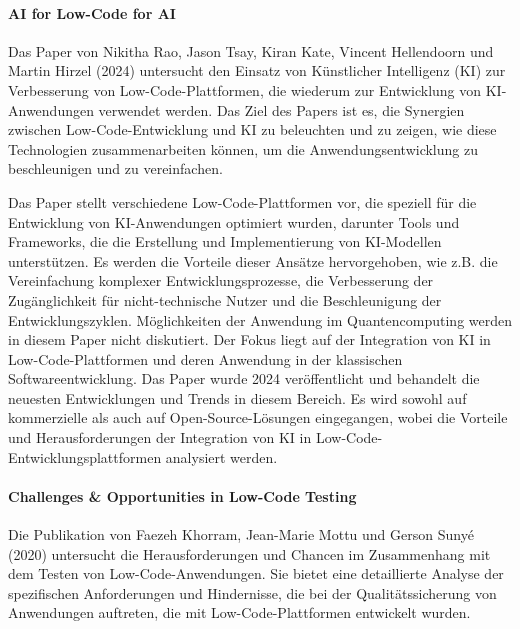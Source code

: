\paragraph{AI for Low-Code for AI}

Das Paper von Nikitha Rao, Jason Tsay, Kiran Kate, Vincent Hellendoorn und Martin Hirzel (2024) untersucht den Einsatz 
von Künstlicher Intelligenz (KI) zur Verbesserung von Low-Code-Plattformen, die wiederum zur Entwicklung von KI-Anwendungen 
verwendet werden. Das Ziel des Papers ist es, die Synergien zwischen Low-Code-Entwicklung und KI zu beleuchten und zu 
zeigen, wie diese Technologien zusammenarbeiten können, um die Anwendungsentwicklung zu beschleunigen und zu vereinfachen.

Das Paper stellt verschiedene Low-Code-Plattformen vor, die speziell für die Entwicklung von KI-Anwendungen optimiert wurden, 
darunter Tools und Frameworks, die die Erstellung und Implementierung von KI-Modellen unterstützen. 
Es werden die Vorteile dieser Ansätze hervorgehoben, wie z.B. die Vereinfachung komplexer Entwicklungsprozesse, 
die Verbesserung der Zugänglichkeit für nicht-technische Nutzer und die Beschleunigung der Entwicklungszyklen. 
Möglichkeiten der Anwendung im Quantencomputing werden in diesem Paper nicht diskutiert. 
Der Fokus liegt auf der Integration von KI in Low-Code-Plattformen und deren Anwendung in der klassischen Softwareentwicklung. 
Das Paper wurde 2024 veröffentlicht und behandelt die neuesten Entwicklungen und Trends in diesem Bereich. 
Es wird sowohl auf kommerzielle als auch auf Open-Source-Lösungen eingegangen, wobei die 
Vorteile und Herausforderungen der Integration von KI in Low-Code-Entwicklungsplattformen analysiert werden.

\paragraph{Challenges \& Opportunities in Low-Code Testing}

Die Publikation von Faezeh Khorram, Jean-Marie Mottu und Gerson Sunyé (2020) untersucht die Herausforderungen und Chancen 
im Zusammenhang mit dem Testen von Low-Code-Anwendungen. Sie bietet eine detaillierte Analyse der spezifischen Anforderungen 
und Hindernisse, die bei der Qualitätssicherung von Anwendungen auftreten, die mit Low-Code-Plattformen entwickelt wurden.

